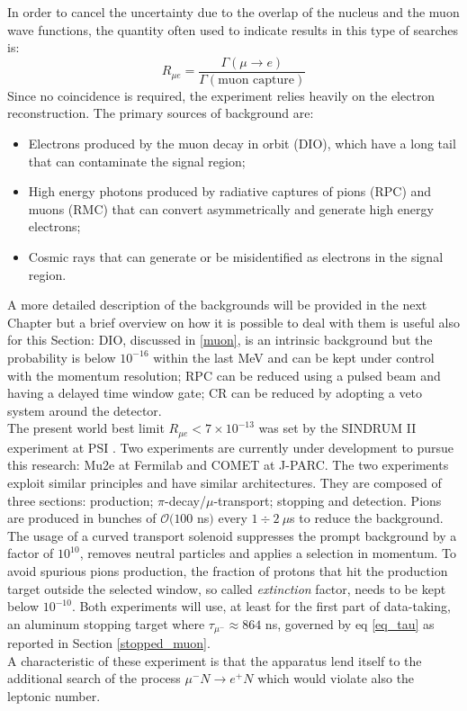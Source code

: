\documentclass[12pt,a4paper,openright, oneside, titlepage]{book} %
\begin{document}
\noindent
In order to cancel the uncertainty due to the overlap of the nucleus and the muon wave functions, the quantity often used to indicate results in this type of searches is: 
$$R_{\mu e} = \frac{\Gamma(\mu\rightarrow e)}{\Gamma(\textrm{muon capture})}$$
Since no coincidence is required, the experiment relies heavily on the electron reconstruction. 
The primary sources of background are:
\begin{itemize}
\item Electrons produced by the muon decay in orbit (DIO), which have a long tail that can contaminate the signal region;
\item High energy photons produced by radiative captures of pions (RPC) and muons (RMC) that can convert asymmetrically and generate high energy electrons;
\item Cosmic rays that can generate or be misidentified as electrons in the signal region.
\end{itemize}
A more detailed description of the backgrounds will be provided in the next Chapter but a brief overview on how it is possible to deal with them is useful also for this Section: 
DIO, discussed in \ref{muon}, is an intrinsic background but the probability is below $10^{-16}$ within the last MeV and can be kept under control with the momentum resolution; RPC can be reduced using a pulsed beam and having a delayed time window gate; CR can be reduced by adopting a veto system around the detector.\\
The present world best limit  $R_{\mu e}<7\times10^{-13}$ was set by the SINDRUM II experiment at PSI \cite{SINDRUMII}.
Two experiments are currently under development to pursue this research: Mu2e \cite{MTDR} at Fermilab and COMET \cite{COMET_I} at J-PARC. 
The two experiments exploit similar principles and have similar architectures.
They are composed of three sections: production; $\pi$-decay/$\mu$-transport; stopping and detection. 
Pions are produced in bunches of $\mathcal{O}(100$ ns$)$ every $1\div 2\ \mu$s to reduce the background. 
The usage of a curved transport solenoid suppresses the prompt background by a factor of $10^{10}$, removes neutral particles and applies a selection in momentum. 
To avoid spurious pions production, the fraction of protons that hit the production target outside the selected window, so called \textit{extinction} factor, needs to be kept below $10^{-10}$. 
Both experiments will use, at least for the first part of data-taking, an aluminum stopping target where $\tau_{\mu^-}\approx 864$ ns, governed by eq \ref{eq_tau} as reported in Section \ref{stopped_muon}. \\
A characteristic of these experiment is that the apparatus lend itself to the additional search of the process $\mu^- N \rightarrow e^+ N$ which would violate also the leptonic number.
\end{document}
